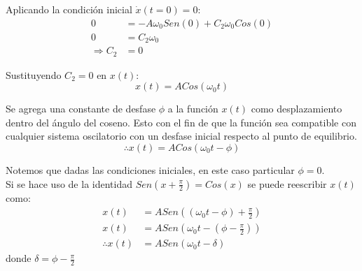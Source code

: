     Aplicando la condición inicial $\dot{x}(t=0)=0$:
    \begin{align*}
        0 &= -A\omega_{0}Sen(0) + C_{2}\omega_{0}Cos(0)\\
        0 &= C_{2}\omega_{0}\\
        \Rightarrow C_{2} &= 0
    \end{align*}

    Sustituyendo $C_{2}=0$ en $x(t)$:
    \begin{equation*}
        x(t) = ACos(\omega_{0}t)
    \end{equation*}

    Se agrega una constante de desfase $\phi$ a la función $x(t)$ como desplazamiento dentro del ángulo del coseno. Esto con el fin de que la función sea compatible con cualquier sistema oscilatorio con un desfase inicial respecto al punto de equilibrio.
    \begin{equation*}
        \therefore x(t) = ACos(\omega_{0}t-\phi)
    \end{equation*}

    Notemos que dadas las condiciones iniciales, en este caso particular $\phi=0$.\\
    Si se hace uso de la identidad $Sen(x+\frac{\pi}{2}) = Cos(x)$ se puede reescribir $x(t)$ como:
    \begin{align*}
        x(t) &= ASen((\omega_{0}t-\phi)+\frac{\pi}{2})\\
        x(t) &= ASen(\omega_{0}t-(\phi-\frac{\pi}{2}))\\
        \therefore x(t) &= ASen (\omega_{0}t-\delta)
    \end{align*}
    donde $\delta=\phi - \frac{\pi}{2}$